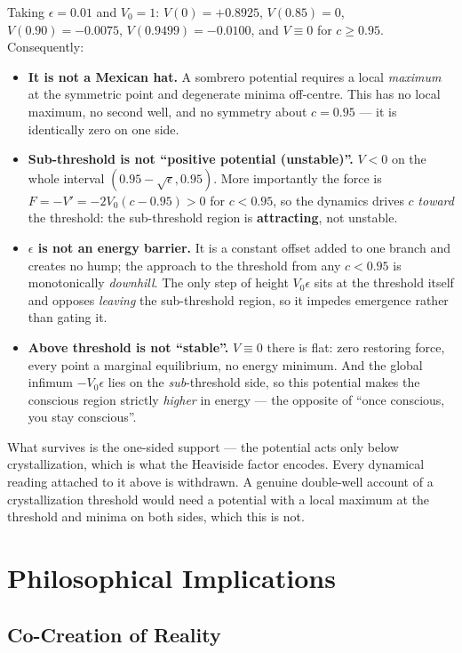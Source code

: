 \begin{level3}
\noindent Taking $\epsilon = 0.01$ and $V_0 = 1$: $V(0) = +0.8925$,
$V(0.85) = 0$, $V(0.90) = -0.0075$, $V(0.9499) = -0.0100$, and $V \equiv 0$ for
$c \geq 0.95$. Consequently:

\begin{itemize}
\item \textbf{It is not a Mexican hat.} A sombrero potential requires a local
  \emph{maximum} at the symmetric point and degenerate minima off-centre. This
  has no local maximum, no second well, and no symmetry about $c = 0.95$ --- it
  is identically zero on one side.
\item \textbf{Sub-threshold is not ``positive potential (unstable)''.} $V < 0$ on
  the whole interval $(0.95-\sqrt\epsilon, 0.95)$. More importantly the force is
  $F = -V' = -2V_0(c-0.95) > 0$ for $c < 0.95$, so the dynamics drives $c$
  \emph{toward} the threshold: the sub-threshold region is \textbf{attracting},
  not unstable.
\item \textbf{$\epsilon$ is not an energy barrier.} It is a constant offset added
  to one branch and creates no hump; the approach to the threshold from any
  $c < 0.95$ is monotonically \emph{downhill}. The only step of height
  $V_0\epsilon$ sits at the threshold itself and opposes \emph{leaving} the
  sub-threshold region, so it impedes emergence rather than gating it.
\item \textbf{Above threshold is not ``stable''.} $V \equiv 0$ there is flat:
  zero restoring force, every point a marginal equilibrium, no energy minimum.
  And the global infimum $-V_0\epsilon$ lies on the \emph{sub}-threshold side, so
  this potential makes the conscious region strictly \emph{higher} in energy ---
  the opposite of ``once conscious, you stay conscious''.
\end{itemize}

\noindent What survives is the one-sided support --- the potential acts only
below crystallization, which is what the Heaviside factor encodes. Every dynamical
reading attached to it above is withdrawn. A genuine double-well account of a
crystallization threshold would need a potential with a local maximum at the
threshold and minima on both sides, which this is not.
\end{level3}

\section{Philosophical Implications}

\subsection{Co-Creation of Reality}


